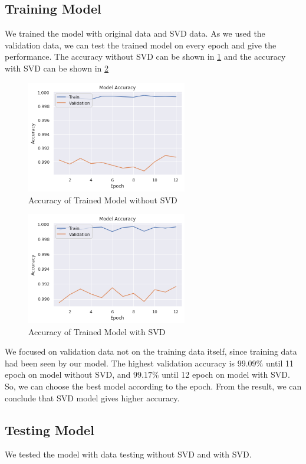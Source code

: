 \documentclass[conference]{IEEEtran}
\begin{document}
\subsection{Training Model}
We trained the model with original data and SVD data. As we used the validation data, we can test the trained model on every epoch and give the performance.
The accuracy without SVD can be shown in \ref{fig:trained_model_without_SVD} and the accuracy with SVD can be shown in \ref{fig:trained_model_with_SVD}
\begin{figure}[htbp]
    \centerline{\includegraphics[width=7cm]{Training_performance_acc.png}}
    \caption{Accuracy of Trained Model without SVD}
    \label{fig:trained_model_without_SVD}
\end{figure}

\begin{figure}[htbp]
    \centerline{\includegraphics[width=7cm]{Training_performance_SVD_acc.png}}
    \caption{Accuracy of Trained Model with SVD}
    \label{fig:trained_model_with_SVD}
\end{figure}
We focused on validation data not on the training data itself, since training data had been seen by our model.
The highest validation accuracy is $99.09 \%$ until 11 epoch on model without SVD, and $99.17 \%$ until 12 epoch on model with SVD. 
So, we can choose the best model according to the epoch. From the result, we can conclude that SVD model gives higher accuracy.  

\subsection{Testing Model}
We tested the model with data testing without SVD and with SVD.  
\end{document}

